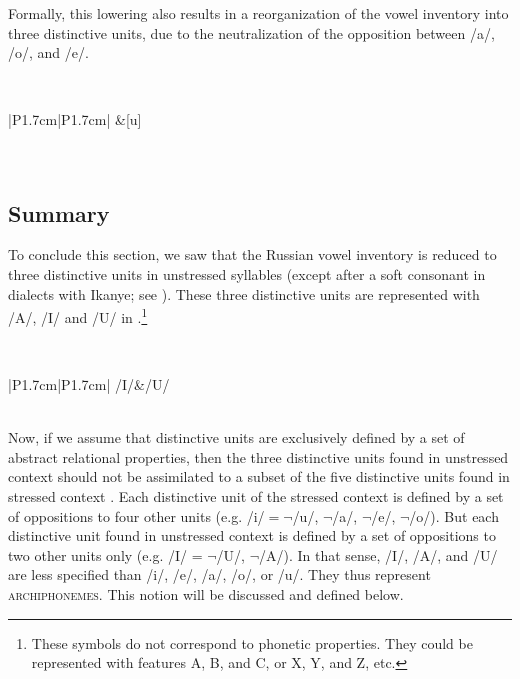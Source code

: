 \documentclass[output=paper,modfonts,newtxmath,hidelinks,]{langscibook}
\begin{document}
\noindent Formally, this lowering also results in a reorganization of the vowel inventory into three distinctive units, due to the neutralization of the opposition between /a/, /o/, and /e/.

\label{5:16}\\\medskip
\begin{tabular}{|P{1.7cm}|P{1.7cm}|}
\hline
[i]&[u]\\\hline
{}\\
\\\hline
\end{tabular}
\z


\subsection{Summary}\label{5:s2.4}

To conclude this section, we saw that the Russian vowel inventory is reduced to three distinctive units in unstressed syllables (except after a soft consonant in dialects with Ikanye; see ). These three distinctive units are represented with /A/, /I/ and /U/ in .\footnote{These symbols do not correspond to phonetic properties. They could be represented with features {\textbar}A{\textbar}, {\textbar}B{\textbar}, and {\textbar}C{\textbar}, or {\textbar}X{\textbar}, {\textbar}Y{\textbar}, and {\textbar}Z{\textbar}, etc.}

\label{5:17}\\\medskip
\begin{tabular}{|P{1.7cm}|P{1.7cm}|}
\hline
/I/&/U/\\\hline
{}\\\hline
\end{tabular}
\z

\noindent Now, if we assume that distinctive units are exclusively defined by a set of abstract relational properties, then the three distinctive units found in unstressed context  should not be assimilated to a subset of the five distinctive units found in stressed context . Each distinctive unit of the stressed context is defined by a set of oppositions to four other units (e.g. /i/${}=\neg{}$/u/, $\neg$/a/, $\neg$/e/, $\neg$/o/). But each distinctive unit found in unstressed context  is defined by a set of oppositions to two other units only (e.g. /I/ = $\neg$/U/, $\neg$/A/). In that sense, /I/, /A/, and /U/ are less specified than /i/, /e/, /a/, /o/, or /u/. They thus represent \textsc{archiphonemes}. This notion will be discussed and defined below.
\end{document}
